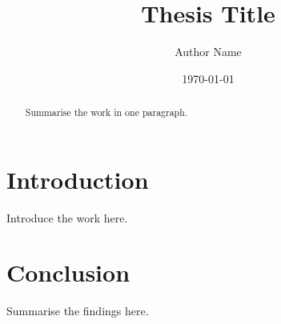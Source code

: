 \documentclass[12pt]{report}
\title{Thesis Title}
\author{Author Name}
\date{\today}
\begin{document}
\maketitle

\begin{abstract}
Summarise the work in one paragraph.
\end{abstract}

\tableofcontents

\chapter{Introduction}
Introduce the work here.

\chapter{Conclusion}
Summarise the findings here.
\end{document}

